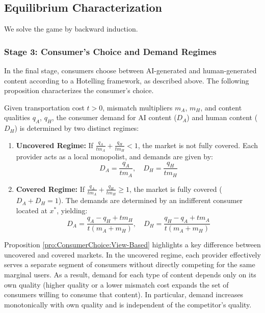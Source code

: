 \subsection{Equilibrium Characterization}\label{ss:vb-equilibrium}

We solve the game by backward induction. 


\subsubsection*{Stage 3: Consumer's Choice and Demand Regimes}

In the final stage, consumers choose between AI-generated and human-generated content according to a Hotelling framework, as described above. The following proposition characterizes the consumer's choice. 
\begin{proposition}\label{pro:ConsumerChoice:View-Based}
Given transportation cost $t>0$, mismatch multipliers $m_A$, $m_H$, and content qualities $q_A$, $q_H$, the consumer demand for AI content ($D_A$) and human content ($D_H$) is determined by two distinct regimes:
\begin{enumerate}
    \item \textbf{Uncovered Regime:} If $\frac{q_A}{t m_A} + \frac{q_H}{t m_H} < 1$, the market is not fully covered. Each provider acts as a local monopolist, and demands are given by:
    \begin{equation*}
        D_A = \frac{q_A}{t m_A}, \quad D_H = \frac{q_H}{t m_H}
    \end{equation*}
    \item \textbf{Covered Regime:} If $\frac{q_A}{t m_A} + \frac{q_H}{t m_H} \ge 1$, the market is fully covered ($D_A + D_H = 1$). The demands are determined by an indifferent consumer located at $x^*$, yielding:
    \begin{equation*}
        D_A = \frac{q_A - q_H + t m_H}{t(m_A + m_H)}, \quad D_H = \frac{q_H - q_A + t m_A}{t(m_A + m_H)}
    \end{equation*}
\end{enumerate}
\end{proposition}
Proposition \ref{pro:ConsumerChoice:View-Based} highlights a key difference between uncovered and covered markets. In the uncovered regime, each provider effectively serves a separate segment of consumers without directly competing for the same marginal users. As a result, demand for each type of content depends only on its own quality (higher quality or a lower mismatch cost expands the set of consumers willing to consume that content). In particular, demand increases monotonically with own quality and is independent of the competitor's quality.

